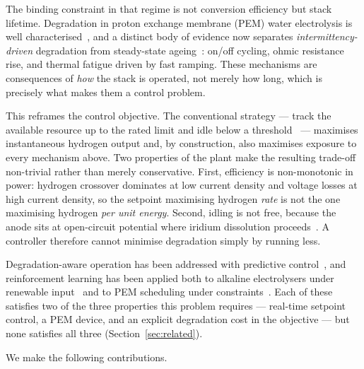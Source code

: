 \documentclass[conference]{IEEEtran}
\begin{document}
The binding constraint in that regime is not conversion efficiency but stack lifetime.
Degradation in proton exchange membrane (PEM) water electrolysis is well
characterised~\cite{feng2017pemwe,bernhardt2026degradation}, and a distinct body of
evidence now separates \emph{intermittency-driven} degradation from steady-state
ageing~\cite{intermittency2025}: on/off cycling, ohmic resistance rise, and thermal fatigue
driven by fast ramping. These mechanisms are consequences of \emph{how} the stack is
operated, not merely how long, which is precisely what makes them a control problem.

This reframes the control objective. The conventional strategy --- track the available
resource up to the rated limit and idle below a threshold~\cite{pvt_control_2026} ---
maximises instantaneous hydrogen output and, by construction, also maximises exposure to
every mechanism above. Two properties of the plant make the resulting trade-off non-trivial
rather than merely conservative. First, efficiency is non-monotonic in power: hydrogen
crossover dominates at low current density and voltage losses at high current density, so
the setpoint maximising hydrogen \emph{rate} is not the one maximising hydrogen \emph{per
unit energy}. Second, idling is not free, because the anode sits at open-circuit potential
where iridium dissolution proceeds~\cite{yu2020iridium}. A controller therefore cannot
minimise degradation simply by running less.

Degradation-aware operation has been addressed with predictive
control~\cite{mpc_refuel_2026}, and reinforcement learning has been applied both to
alkaline electrolysers under renewable input~\cite{awe_rl_2025} and to PEM scheduling under
constraints~\cite{drl_scheduling_2026}. Each of these satisfies two of the three properties
this problem requires --- real-time setpoint control, a PEM device, and an explicit
degradation cost in the objective --- but none satisfies all three
(Section~\ref{sec:related}).

We make the following contributions.
\end{document}
